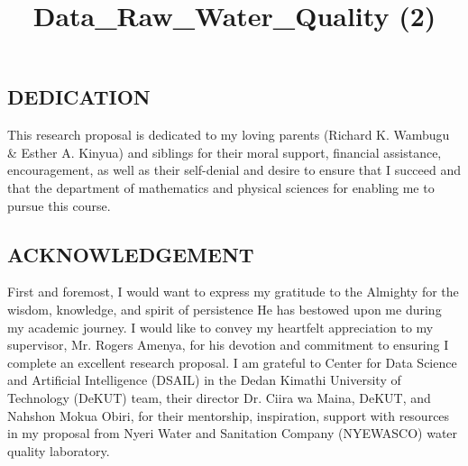 \documentclass[12pt]{report}
\title{Data\_Raw\_Water\_Quality (2)}
\renewcommand{\sectionname}{}
\renewcommand\thesection{\arabic{section}}
\begin{document}
\renewcommand{\bibname}{\centering REFERENCES}


\linespread{1.5}



%
\subsection*{DEDICATION}
\par
This research proposal is dedicated to my loving parents (Richard K. Wambugu \& Esther A. Kinyua) and siblings
for their moral support, financial assistance, encouragement, as well
as their self-denial and desire to ensure that I succeed and that the
department of mathematics and physical sciences for enabling me
to pursue this course.
\par

\clearpage

\subsection*{ACKNOWLEDGEMENT}
First and foremost, I would want to express my gratitude to the
Almighty for the wisdom, knowledge, and spirit of persistence He
has bestowed upon me during my academic journey. I would like
to convey my heartfelt appreciation to my supervisor, Mr. Rogers
Amenya, for his devotion and commitment to ensuring I complete
an excellent research proposal. I am grateful to Center for Data
Science and Artificial Intelligence (DSAIL) in the Dedan Kimathi
University of Technology (DeKUT) team, their director Dr. Ciira
wa Maina, DeKUT, and Nahshon Mokua Obiri, for their mentorship,
inspiration, support with resources in my proposal  from Nyeri Water
and Sanitation Company (NYEWASCO) water quality laboratory.
\clearpage


\renewcommand{\sectionname}{}
\renewcommand\thesection{\arabic{section}}
\end{document}

